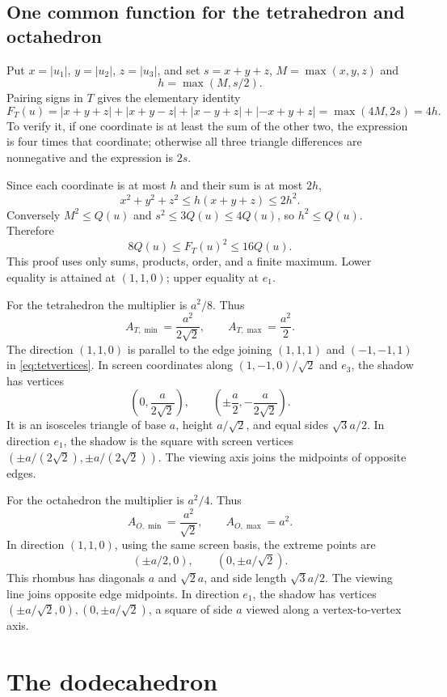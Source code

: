 \documentclass[11pt,a4paper]{article}
\newcommand{\abs}[1]{\left|#1\right|}
\begin{document}
\subsection{One common function for the tetrahedron and octahedron}
Put $x=\abs{u_1}$, $y=\abs{u_2}$, $z=\abs{u_3}$, and set $s=x+y+z$, $M=\max(x,y,z)$ and
\[
 h=\max(M,s/2).
\]
Pairing signs in $T$ gives the elementary identity
\begin{equation}\label{eq:fourabs}
 F_T(u)=\abs{x+y+z}+\abs{x+y-z}+\abs{x-y+z}+\abs{-x+y+z}
 =\max(4M,2s)=4h.
\end{equation}
To verify it, if one coordinate is at least the sum of the other two, the expression is four times that coordinate; otherwise all three triangle differences are nonnegative and the expression is $2s$.

Since each coordinate is at most $h$ and their sum is at most $2h$,
\begin{equation}\label{eq:smalllower}
 x^2+y^2+z^2\le h(x+y+z)\le2h^2.
\end{equation}
Conversely $M^2\le Q(u)$ and $s^2\le3Q(u)\le4Q(u)$, so $h^2\le Q(u)$. Therefore
\[
 8Q(u)\le F_T(u)^2\le16Q(u).
\]
This proof uses only sums, products, order, and a finite maximum. Lower equality is attained at $(1,1,0)$; upper equality at $e_1$.

For the tetrahedron the multiplier is $a^2/8$. Thus
\[
 A_{T,\min}=\frac{a^2}{2\sqrt2},\qquad A_{T,\max}=\frac{a^2}{2}.
\]
The direction $(1,1,0)$ is parallel to the edge joining $(1,1,1)$ and $(-1,-1,1)$ in \eqref{eq:tetvertices}. In screen coordinates along $(1,-1,0)/\sqrt2$ and $e_3$, the shadow has vertices
\[
 \left(0,\frac{a}{2\sqrt2}\right),\qquad
 \left(\pm\frac a2,-\frac{a}{2\sqrt2}\right).
\]
It is an isosceles triangle of base $a$, height $a/\sqrt2$, and equal sides $\sqrt3a/2$. In direction $e_1$, the shadow is the square with screen vertices $(\pm a/(2\sqrt2),\pm a/(2\sqrt2))$. The viewing axis joins the midpoints of opposite edges.

For the octahedron the multiplier is $a^2/4$. Thus
\[
 A_{O,\min}=\frac{a^2}{\sqrt2},\qquad A_{O,\max}=a^2.
\]
In direction $(1,1,0)$, using the same screen basis, the extreme points are
\[
 (\pm a/2,0),\qquad(0,\pm a/\sqrt2).
\]
This rhombus has diagonals $a$ and $\sqrt2a$, and side length $\sqrt3a/2$. The viewing line joins opposite edge midpoints. In direction $e_1$, the shadow has vertices $(\pm a/\sqrt2,0),(0,\pm a/\sqrt2)$, a square of side $a$ viewed along a vertex-to-vertex axis.

\section{The dodecahedron}\label{sec:dodeca}
\end{document}
